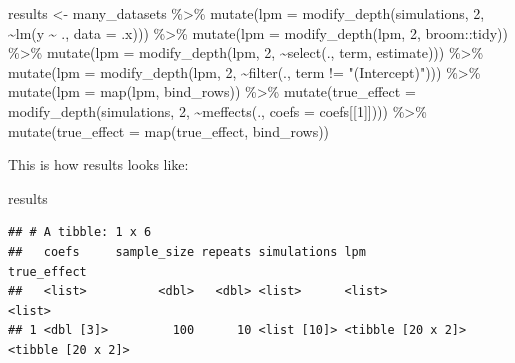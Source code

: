 \documentclass[
]{article}
\newenvironment{Shaded}{\begin{snugshade}}{\end{snugshade}}
\newcommand{\AttributeTok}[1]{\textcolor[rgb]{0.77,0.63,0.00}{#1}}
\newcommand{\DecValTok}[1]{\textcolor[rgb]{0.00,0.00,0.81}{#1}}
\newcommand{\FunctionTok}[1]{\textcolor[rgb]{0.00,0.00,0.00}{#1}}
\newcommand{\NormalTok}[1]{#1}
\newcommand{\OtherTok}[1]{\textcolor[rgb]{0.56,0.35,0.01}{#1}}
\newcommand{\SpecialCharTok}[1]{\textcolor[rgb]{0.00,0.00,0.00}{#1}}
\newcommand{\StringTok}[1]{\textcolor[rgb]{0.31,0.60,0.02}{#1}}
\begin{document}
\begin{Shaded}
\begin{Highlighting}[]
\NormalTok{results }\OtherTok{\textless{}{-}}\NormalTok{ many\_datasets }\SpecialCharTok{\%\textgreater{}\%} 
  \FunctionTok{mutate}\NormalTok{(}\AttributeTok{lpm =} \FunctionTok{modify\_depth}\NormalTok{(simulations, }\DecValTok{2}\NormalTok{, }\SpecialCharTok{\textasciitilde{}}\FunctionTok{lm}\NormalTok{(y }\SpecialCharTok{\textasciitilde{}}\NormalTok{ ., }\AttributeTok{data =}\NormalTok{ .x))) }\SpecialCharTok{\%\textgreater{}\%} 
  \FunctionTok{mutate}\NormalTok{(}\AttributeTok{lpm =} \FunctionTok{modify\_depth}\NormalTok{(lpm, }\DecValTok{2}\NormalTok{, broom}\SpecialCharTok{::}\NormalTok{tidy)) }\SpecialCharTok{\%\textgreater{}\%} 
  \FunctionTok{mutate}\NormalTok{(}\AttributeTok{lpm =} \FunctionTok{modify\_depth}\NormalTok{(lpm, }\DecValTok{2}\NormalTok{, }\SpecialCharTok{\textasciitilde{}}\FunctionTok{select}\NormalTok{(., term, estimate))) }\SpecialCharTok{\%\textgreater{}\%} 
  \FunctionTok{mutate}\NormalTok{(}\AttributeTok{lpm =} \FunctionTok{modify\_depth}\NormalTok{(lpm, }\DecValTok{2}\NormalTok{, }\SpecialCharTok{\textasciitilde{}}\FunctionTok{filter}\NormalTok{(., term }\SpecialCharTok{!=} \StringTok{"(Intercept)"}\NormalTok{))) }\SpecialCharTok{\%\textgreater{}\%} 
  \FunctionTok{mutate}\NormalTok{(}\AttributeTok{lpm =} \FunctionTok{map}\NormalTok{(lpm, bind\_rows)) }\SpecialCharTok{\%\textgreater{}\%} 
  \FunctionTok{mutate}\NormalTok{(}\AttributeTok{true\_effect =} \FunctionTok{modify\_depth}\NormalTok{(simulations, }\DecValTok{2}\NormalTok{, }\SpecialCharTok{\textasciitilde{}}\FunctionTok{meffects}\NormalTok{(., }\AttributeTok{coefs =}\NormalTok{ coefs[[}\DecValTok{1}\NormalTok{]]))) }\SpecialCharTok{\%\textgreater{}\%} 
  \FunctionTok{mutate}\NormalTok{(}\AttributeTok{true\_effect =} \FunctionTok{map}\NormalTok{(true\_effect, bind\_rows))}
\end{Highlighting}
\end{Shaded}

This is how results looks like:

\begin{Shaded}
\begin{Highlighting}[]
\NormalTok{results}
\end{Highlighting}
\end{Shaded}

\begin{verbatim}
## # A tibble: 1 x 6
##   coefs     sample_size repeats simulations lpm               true_effect      
##   <list>          <dbl>   <dbl> <list>      <list>            <list>           
## 1 <dbl [3]>         100      10 <list [10]> <tibble [20 x 2]> <tibble [20 x 2]>
\end{verbatim}
\end{document}
